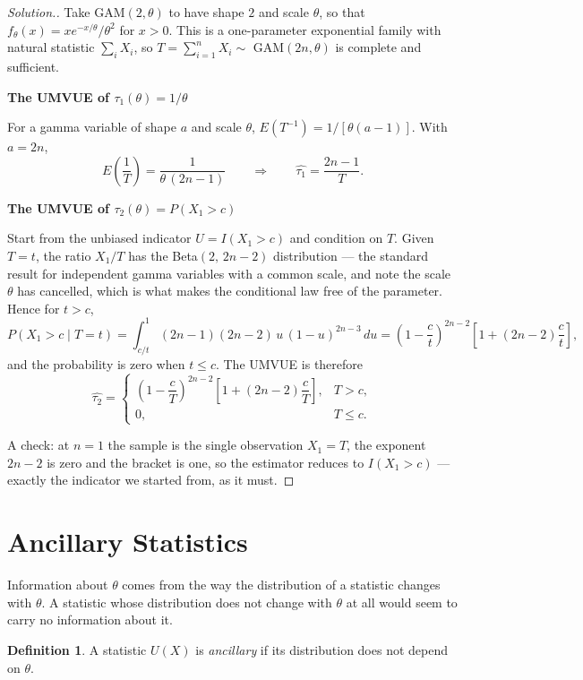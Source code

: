\documentclass[12pt,a4paper]{report}
\theoremstyle{definition}
\newtheorem{defn}[thm]{Definition}
\newcommand{\subhead}[1]{%
  \par\medskip\noindent\textbf{#1}\par\nobreak\smallskip}
\newenvironment{solution}
  {\renewcommand{\qedsymbol}{}\begin{proof}[\textit{Solution}.]}
  {\end{proof}}
\begin{document}
\begin{solution}
Take GAM$(2,\theta)$ to have shape $2$ and scale $\theta$, so that
$f_{\theta}(x) = x e^{-x/\theta}/\theta^{2}$ for $x>0$. This is a one-parameter
exponential family with natural statistic $\sum_i X_i$, so
$T=\sum_{i=1}^{n}X_i\sim$ GAM$(2n,\theta)$ is complete and sufficient.

\subhead{The UMVUE of $\tau_1(\theta)=1/\theta$}
For a gamma variable of shape $a$ and scale $\theta$,
$E\left(T^{-1}\right) = 1/\left[\theta(a-1)\right]$. With $a=2n$,
\[E\left(\frac{1}{T}\right) = \frac{1}{\theta\,(2n-1)}
\qquad\Longrightarrow\qquad
\widehat{\tau_1} = \frac{2n-1}{T} .\]

\subhead{The UMVUE of $\tau_2(\theta)=P\left(X_1>c\right)$}
Start from the unbiased indicator $U = I\left(X_1>c\right)$ and condition on
$T$. Given $T=t$, the ratio $X_1/T$ has the Beta$(2,\,2n-2)$ distribution ---
the standard result for independent gamma variables with a common scale, and
note the scale $\theta$ has cancelled, which is what makes the conditional law
free of the parameter. Hence for $t>c$,
\[P\left(X_1>c \mid T=t\right)
= \int_{c/t}^{1}(2n-1)(2n-2)\,u\,(1-u)^{2n-3}\,du
= \left(1-\frac{c}{t}\right)^{2n-2}\left[1+(2n-2)\frac{c}{t}\right],\]
and the probability is zero when $t\leq c$. The UMVUE is therefore
\[\widehat{\tau_2} =
\begin{cases}
\left(1-\dfrac{c}{T}\right)^{2n-2}\left[1+(2n-2)\dfrac{c}{T}\right], & T>c,\\[10pt]
0, & T\leq c .
\end{cases}\]

A check: at $n=1$ the sample is the single observation $X_1=T$, the exponent
$2n-2$ is zero and the bracket is one, so the estimator reduces to
$I\left(X_1>c\right)$ --- exactly the indicator we started from, as it must.
\end{solution}

\section{Ancillary Statistics}

Information about $\theta$ comes from the way the distribution of a statistic
changes with $\theta$. A statistic whose distribution does not change with $\theta$
at all would seem to carry no information about it.

\begin{defn}
\label{def:ancillary}
A statistic $U(X)$ is \emph{ancillary} if its distribution does not depend on
$\theta$.
\end{defn}
\end{document}
